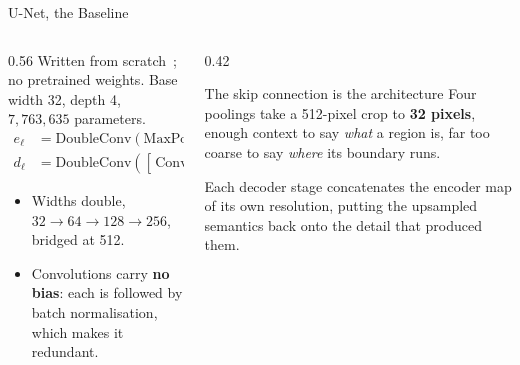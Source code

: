 \begin{frame}{U-Net, the Baseline}
\small
\begin{columns}[T]
\begin{column}{0.56\textwidth}
Written from scratch~\cite{ronneberger2015unet}; no pretrained weights. Base width 32, depth 4,
$7{,}763{,}635$ parameters.
\begin{equation*}
\begin{aligned}
    e_\ell &= \mathrm{DoubleConv}(\mathrm{MaxPool}_2(e_{\ell-1})) \\
    d_\ell &= \mathrm{DoubleConv}([\,\mathrm{ConvT}_2(d_{\ell+1});\, e_\ell\,])
\end{aligned}
\end{equation*}
\begin{itemize}
    \item Widths double, $32 \to 64 \to 128 \to 256$, bridged at 512.
    \item Convolutions carry \textbf{no bias}: each is followed by batch normalisation, which
          makes it redundant.
\end{itemize}
\end{column}
\begin{column}{0.42\textwidth}
\begin{block}{The skip connection is the architecture}
Four poolings take a 512-pixel crop to \textbf{32 pixels}, enough context to say \emph{what} a
region is, far too coarse to say \emph{where} its boundary runs.

Each decoder stage concatenates the encoder map of its own resolution, putting the upsampled
semantics back onto the detail that produced them.
\end{block}
\end{column}
\end{columns}
\end{frame}

